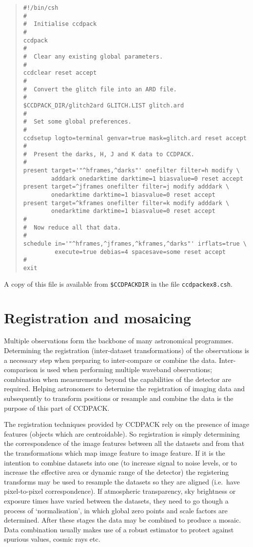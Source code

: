 \documentclass[twoside,11pt]{article}
\newcommand{\xlabel}[1]{}
\renewcommand{\_}{\texttt{\symbol{95}}}
\newenvironment{myquote}{\begin{quote}\begin{small}}{\end{small}\end{quote}}
\newcommand{\text}[1]{{\small \tt #1}}
\begin{document}
\begin{myquote}
\begin{verbatim}
#!/bin/csh
#
#  Initialise ccdpack
#
ccdpack
#
#  Clear any existing global parameters.
#
ccdclear reset accept
#
#  Convert the glitch file into an ARD file.
#
$CCDPACK_DIR/glitch2ard GLITCH.LIST glitch.ard
#
#  Set some global preferences.
#
ccdsetup logto=terminal genvar=true mask=glitch.ard reset accept
#
#  Present the darks, H, J and K data to CCDPACK.
#
present target='"^hframes,^darks"' onefilter filter=h modify \
        adddark onedarktime darktime=1 biasvalue=0 reset accept
present target=^jframes onefilter filter=j modify adddark \
        onedarktime darktime=1 biasvalue=0 reset accept
present target=^kframes onefilter filter=k modify adddark \
        onedarktime darktime=1 biasvalue=0 reset accept
#
#  Now reduce all that data.
#
schedule in='"^hframes,^jframes,^kframes,^darks"' irflats=true \
         execute=true debias=4 spacesave=some reset accept
#
exit
\end{verbatim}
\end{myquote}
A copy of this file is available from
\text{\$CCDPACK\_DIR} in the file \text{ccdpack\_ex8.csh}.

\section{Registration and mosaicing \xlabel{mosaicing}}

Multiple observations form the backbone of many astronomical programmes.
Determining the registration (inter-dataset transformations) of the
observations is a necessary step when preparing to inter-compare or
combine the data. Inter-comparison is used when performing multiple
waveband observations; combination when measurements beyond the
capabilities of the detector are required. Helping astronomers to
determine the registration of imaging data and subsequently to transform
positions or resample and combine the data is the purpose of this part
of CCDPACK.

The registration techniques provided by CCDPACK rely on the presence
of image features (objects which are centroidable). So registration is
simply determining the correspondence of the image features between
all the datasets and from that the transformations which map image
feature to image feature. If it is the intention to combine datasets
into one (to increase signal to noise levels, or to increase the
effective area or dynamic range of the detector) the registering
transforms may be used to resample the datasets so they are aligned
(i.e.\ have pixel-to-pixel correspondence).  If atmospheric
transparency, sky brightness or exposure times have varied between the
datasets, they need to go though a process of `normalisation', in
which global zero points and scale factors are determined. After these
stages the data may be combined to produce a mosaic. Data combination
usually makes use of a robust estimator to protect against spurious
values, cosmic rays etc.
\end{document}
